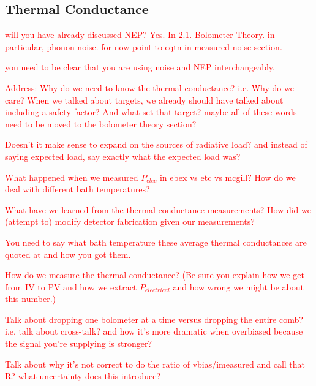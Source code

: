 \subsection{Thermal Conductance}
\label{sec:thermal_conductance}

\textcolor{red}{will you have already discussed \ac{NEP}? Yes. In 2.1. Bolometer Theory. in particular, phonon noise. for now point to eqtn in measured noise section.}

\textcolor{red}{you need to be clear that you are using noise and \ac{NEP} interchangeably.}

\textcolor{red}{Address: Why do we need to know the thermal conductance? i.e. Why do we care? When we talked about targets, we already should have talked about including a safety factor? And what set that target? maybe all of these words need to be moved to the bolometer theory section?}

\textcolor{red}{Doesn't it make sense to expand on the sources of radiative load? and instead of saying expected load, say exactly what the expected load was?}

\textcolor{red}{ What happened when we measured $P_{elec}$ in ebex vs etc vs mcgill? How do we deal with different bath temperatures?}

\textcolor{red}{What have we learned from the thermal conductance measurements? How did we (attempt to) modify detector fabrication given our measurements?}

\textcolor{red}{You need to say what bath temperature these average thermal conductances are quoted at and how you got them.}

\textcolor{red}{How do we measure the thermal conductance? (Be sure you explain how we get from IV to PV and how we extract $P_{electrical}$ and how wrong we might be about this number.)}

\textcolor{red}{Talk about dropping one bolometer at a time versus dropping the entire comb? i.e. talk about cross-talk? and how it's more dramatic when overbiased because the signal you're supplying is stronger?}

\textcolor{red}{Talk about why it's not correct to do the ratio of vbias/imeasured and call that R? what uncertainty does this introduce?}

